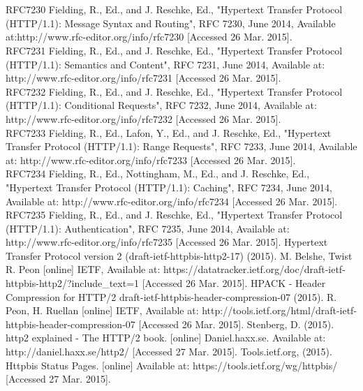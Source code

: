 \section*{}
\label{chap:references}
\begin{thebibliography}{99}
RFC7230 Fielding, R., Ed., and J. Reschke, Ed., "Hypertext Transfer Protocol (HTTP/1.1): Message Syntax and Routing", RFC 7230, June 2014, Available at:http://www.rfc-editor.org/info/rfc7230  [Accessed 26 Mar. 2015]. \\
RFC7231 Fielding, R., Ed., and J. Reschke, Ed., "Hypertext Transfer Protocol (HTTP/1.1): Semantics and Content", RFC 7231, June 2014, Available at: http://www.rfc-editor.org/info/rfc7231 [Accessed 26 Mar. 2015]. \\
RFC7232 Fielding, R., Ed., and J. Reschke, Ed., "Hypertext Transfer Protocol (HTTP/1.1): Conditional Requests", RFC 7232, June 2014, Available at: http://www.rfc-editor.org/info/rfc7232 [Accessed 26 Mar. 2015]. \\ 
RFC7233 Fielding, R., Ed., Lafon, Y., Ed., and J. Reschke, Ed., "Hypertext Transfer Protocol (HTTP/1.1): Range Requests", RFC 7233, June 2014, Available at: http://www.rfc-editor.org/info/rfc7233 [Accessed 26 Mar. 2015]. \\
RFC7234 Fielding, R., Ed., Nottingham, M., Ed., and J. Reschke, Ed., "Hypertext Transfer Protocol (HTTP/1.1): Caching", RFC 7234, June 2014, Available at: http://www.rfc-editor.org/info/rfc7234 [Accessed 26 Mar. 2015]. \\
RFC7235 Fielding, R., Ed., and J. Reschke, Ed., "Hypertext Transfer Protocol (HTTP/1.1): Authentication", RFC 7235, June 2014, Available at: http://www.rfc-editor.org/info/rfc7235 [Accessed 26 Mar. 2015].
Hypertext Transfer Protocol version 2 (draft-ietf-httpbis-http2-17) (2015). M. Belshe, Twist R. Peon [online] IETF, Available at:
https://datatracker.ietf.org/doc/draft-ietf-httpbis-http2/?include\_text=1 [Accessed 26 Mar. 2015].
HPACK - Header Compression for HTTP/2 draft-ietf-httpbis-header-compression-07 (2015). R. Peon,  H. Ruellan [online] IETF, Available at: http://tools.ietf.org/html/draft-ietf-httpbis-header-compression-07 [Accessed 26 Mar. 2015].
Stenberg, D. (2015). http2 explained - The HTTP/2 book. [online] Daniel.haxx.se. Available at: http://daniel.haxx.se/http2/ [Accessed 27 Mar. 2015].
Tools.ietf.org, (2015). Httpbis Status Pages. [online] Available at: https://tools.ietf.org/wg/httpbis/ [Accessed 27 Mar. 2015].

\end{thebibliography}
